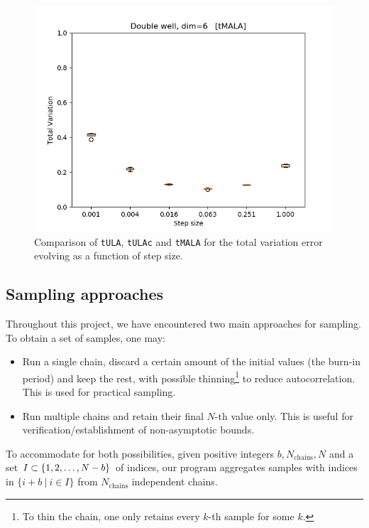 \begin{figure}[H]
\begin{minipage}[b]{0.32\textwidth}
  \end{minipage} %
  \begin{minipage}[b]{0.32\textwidth}
  \centering
    \includegraphics[width=\textwidth]{Figures/tmala_tv.png}
  \end{minipage}
   \caption{Comparison of \texttt{tULA}, \texttt{tULAc} and \texttt{tMALA} for the total variation error evolving as a function of step size.}
\end{figure}




\subsection{Sampling approaches}

Throughout this project, we have encountered two main approaches for sampling. To obtain a set of samples, one may:

\begin{itemize}
    \item Run a single chain, discard a certain amount of the initial values (the burn-in period) and keep the rest, with possible thinning\footnote{To thin the chain, one only retains every $k$-th sample for some $k$.} to reduce autocorrelation. This is used for practical sampling.
    \item Run multiple chains and retain their final $N$-th value only. This is useful for verification/establishment of non-asymptotic bounds.
\end{itemize}

To accommodate for both possibilities, given positive integers $b, N_{\text{chains}}, N$ and a set $I \subset \mathbb \{1, 2, \dots, N - b\}$ of indices, our program aggregates samples with indices in $\{i+b\ |\ i \in I\} $  from $ N_{\text{chains}}$ independent chains.

